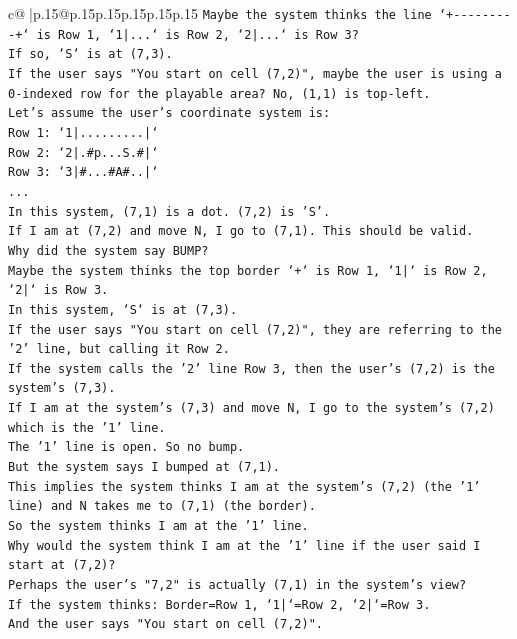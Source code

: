 \documentclass{article}
\begin{document}
{\begin{supertabular}{c@{$\;$}|p{.15\linewidth}@{}p{.15\linewidth}p{.15\linewidth}p{.15\linewidth}p{.15\linewidth}p{.15\linewidth}}
{{{\texttt{Maybe the system thinks the line `+{-}{-}{-}{-}{-}{-}{-}{-}{-}+` is Row 1, `1|...` is Row 2, `2|...` is Row 3?} \\
\texttt{If so, `S` is at (7,3).} \\
\texttt{If the user says "You start on cell (7,2)", maybe the user is using a 0{-}indexed row for the playable area? No, (1,1) is top{-}left.} \\
\texttt{Let's assume the user's coordinate system is:} \\
\texttt{Row 1: `1|.........|`} \\
\texttt{Row 2: `2|.\#p...S.\#|`} \\
\texttt{Row 3: `3|\#...\#A\#..|`} \\
\texttt{...} \\
\texttt{In this system, (7,1) is a dot. (7,2) is 'S'.} \\
\texttt{If I am at (7,2) and move N, I go to (7,1). This should be valid.} \\
\texttt{Why did the system say BUMP?} \\
\texttt{Maybe the system thinks the top border `+` is Row 1, `1|` is Row 2, `2|` is Row 3.} \\
\texttt{In this system, `S` is at (7,3).} \\
\texttt{If the user says "You start on cell (7,2)", they are referring to the '2' line, but calling it Row 2.} \\
\texttt{If the system calls the '2' line Row 3, then the user's (7,2) is the system's (7,3).} \\
\texttt{If I am at the system's (7,3) and move N, I go to the system's (7,2) which is the '1' line.} \\
\texttt{The '1' line is open. So no bump.} \\
\texttt{But the system says I bumped at (7,1).} \\
\texttt{This implies the system thinks I am at the system's (7,2) (the '1' line) and N takes me to (7,1) (the border).} \\
\texttt{So the system thinks I am at the '1' line.} \\
\texttt{Why would the system think I am at the '1' line if the user said I start at (7,2)?} \\
\texttt{Perhaps the user's "7,2" is actually (7,1) in the system's view?} \\
\texttt{If the system thinks: Border=Row 1, `1|`=Row 2, `2|`=Row 3.} \\
\texttt{And the user says "You start on cell (7,2)".} \\
}}}
\end{supertabular}}
\end{document}
